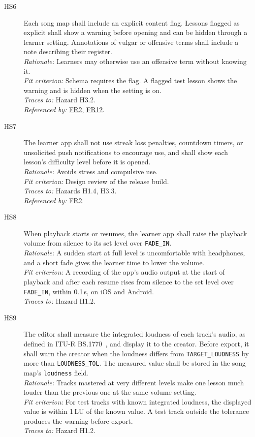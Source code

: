 \documentclass[12pt]{article}
\newcommand{\cn}[1]{\texttt{#1}}
\newcommand{\rat}[1]{\\\textit{Rationale:} #1}
\newcommand{\fit}[1]{\\\textit{Fit criterion:} #1}
\newcommand{\trace}[1]{\\\textit{Traces to:} #1}
\newcommand{\usedby}[1]{\\\textit{Referenced by:} #1}
\newcommand{\reqdef}[1]{\hypertarget{req:#1}{#1}}
\newcommand{\req}[1]{\hyperlink{req:#1}{#1}}
\begin{document}
\begin{description}
\item[\reqdef{HS6}] Each song map shall include an explicit content flag. Lessons
flagged as explicit shall show a warning before opening and can be hidden
through a learner setting. Annotations of vulgar or offensive terms shall
include a note describing their register.
\rat{Learners may otherwise use an offensive term without knowing it.}
\fit{Schema requires the flag. A flagged test lesson shows the warning and is
hidden when the setting is on.}
\trace{Hazard H3.2.}
\usedby{\req{FR2}, \req{FR12}.}

\item[\reqdef{HS7}] The learner app shall not use streak loss penalties, countdown
timers, or unsolicited push notifications to encourage use, and shall show each
lesson's difficulty level before it is opened.
\rat{Avoids stress and compulsive use.}
\fit{Design review of the release build.}
\trace{Hazards H1.4, H3.3.}
\usedby{\req{FR2}.}

\item[\reqdef{HS8}] When playback starts or resumes, the learner app shall raise the
playback volume from silence to its set level over \cn{FADE\_IN}.
\rat{A sudden start at full level is uncomfortable with headphones, and a
short fade gives the learner time to lower the volume.}
\fit{A recording of the app's audio output at the start of playback and after
each resume rises from silence to the set level over \cn{FADE\_IN}, within
0.1\,s, on iOS and Android.}
\trace{Hazard H1.2.}

\item[\reqdef{HS9}] The editor shall measure the integrated loudness of each track's
audio, as defined in ITU-R BS.1770~\cite{BS1770}, and display it to the
creator. Before export, it shall warn the creator when the loudness differs
from \cn{TARGET\_LOUDNESS} by more than \cn{LOUDNESS\_TOL}. The measured value
shall be stored in the song map's \texttt{loudness} field.
\rat{Tracks mastered at very different levels make one lesson much louder than
the previous one at the same volume setting.}
\fit{For test tracks with known integrated loudness, the displayed value is
within 1\,LU of the known value. A test track outside the tolerance produces
the warning before export.}
\trace{Hazard H1.2.}
\end{description}
\end{document}
